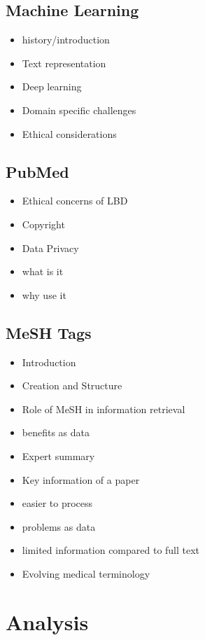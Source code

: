 \documentclass{l4proj}
\begin{document}
\section{Machine Learning}
\begin{itemize}
    \item history/introduction
    \item Text representation
    \item Deep learning
    \item Domain specific challenges
    \item Ethical considerations
\end{itemize}

\section{PubMed}
\begin{itemize}
    \item Ethical concerns of LBD
    \item Copyright
    \item Data Privacy
    \item what is it
    \item why use it
\end{itemize}

\section{MeSH Tags}
\begin{itemize}
    \item Introduction
    \item Creation and Structure
    \item Role of MeSH in information retrieval 
    \item benefits as data 
    \item Expert summary
    \item Key information of a paper
    \item easier to process
    \item problems as data
    \item limited information compared to full text
    \item Evolving medical terminology
\end{itemize}

\chapter{Analysis}
\end{document}
